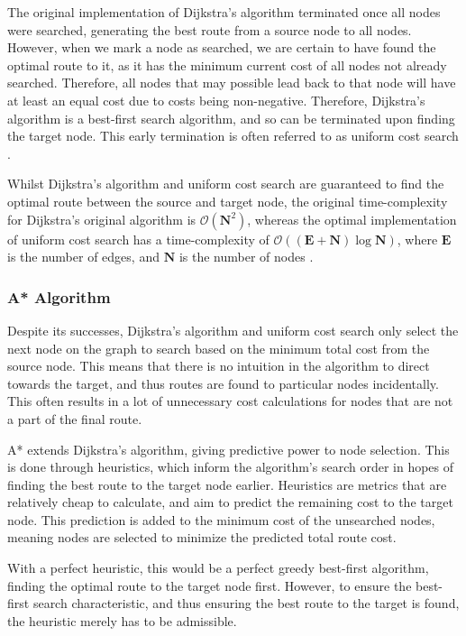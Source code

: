 \documentclass[12pt]{article}
\begin{document}
The original implementation of Dijkstra's algorithm terminated once all nodes were searched, generating the best route from a source node to all nodes. However, when we mark a node as searched, we are certain to have found the optimal route to it, as it has the minimum current cost of all nodes not already searched. Therefore, all nodes that may possible lead back to that node will have at least an equal cost due to costs being non-negative. Therefore, Dijkstra's algorithm is a best-first search algorithm, and so can be terminated upon finding the target node. This early termination is often referred to as uniform cost search \autocite{felner2011search}.

Whilst Dijkstra's algorithm and uniform cost search are guaranteed to find the optimal route between the source and target node, the original time-complexity for Dijkstra's original algorithm is $\mathcal{O} (\mathbf{N}^2)$, whereas the optimal implementation of uniform cost search has a time-complexity of $\mathcal{O} ((\mathbf{E} + \mathbf{N})\log{\mathbf{N}})$, where $\mathbf{E}$ is the number of edges, and $\mathbf{N}$ is the number of nodes \autocite{felner2011search}.

\subsubsection{A* Algorithm}

Despite its successes, Dijkstra's algorithm and uniform cost search only select the next node on the graph to search based on the minimum total cost from the source node. This means that there is no intuition in the algorithm to direct towards the target, and thus routes are found to particular nodes incidentally. This often results in a lot of unnecessary cost calculations for nodes that are not a part of the final route.

A* extends Dijkstra's algorithm, giving predictive power to node selection. This is done through heuristics, which inform the algorithm's search order in hopes of finding the best route to the target node earlier. Heuristics are metrics that are relatively cheap to calculate, and aim to predict the remaining cost to the target node. This prediction is added to the minimum cost of the unsearched nodes, meaning nodes are selected to minimize the predicted total route cost.

With a perfect heuristic, this would be a perfect greedy best-first algorithm, finding the optimal route to the target node first. However, to ensure the best-first search characteristic, and thus ensuring the best route to the target is found, the heuristic merely has to be admissible.
\end{document}
